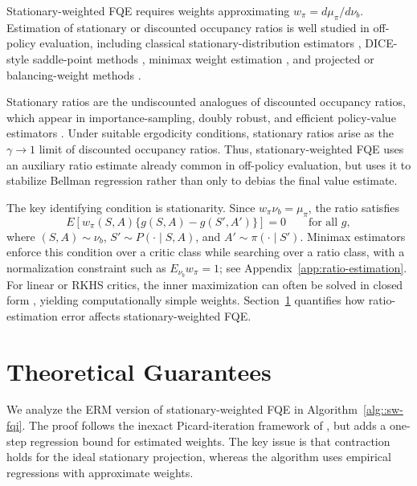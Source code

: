 \documentclass{article}
\theoremstyle{plain}
\theoremstyle{definition}
\theoremstyle{remark}
\begin{document}
Stationary-weighted FQE requires weights approximating
\(w_\pi=d\mu_\pi/d\nu_b\). Estimation of stationary or discounted occupancy
ratios is well studied in off-policy evaluation, including classical
stationary-distribution estimators
\citep{glynn1998estimation,paulin2015concentration,meggendorfer2023correct},
DICE-style saddle-point methods
\citep{liu2018breaking,nachum2019dualdice,nachum2019algaedice,
zhang2020gendice,lee2021optidice,lee2022coptidice}, minimax weight estimation
\citep{uehara2020minimax,uehara2021finite}, and projected or balancing-weight
methods \citep{wang2023projected,amortila2024harnessing}.

Stationary ratios are the undiscounted analogues of discounted occupancy ratios,
which appear in importance-sampling, doubly robust, and efficient policy-value
estimators
\citep{jiang2016doubly,thomas2016data,kallus2020double,kallus2022efficiently,
van2025automaticDRL}. Under suitable ergodicity conditions,
stationary ratios arise as the \(\gamma\to1\) limit of discounted occupancy
ratios. Thus, stationary-weighted FQE uses an auxiliary ratio estimate already
common in off-policy evaluation, but uses it to stabilize Bellman regression
rather than only to debias the final value estimate.

The key identifying condition is stationarity. Since \(w_\pi\nu_b=\mu_\pi\),
the ratio satisfies
\[
E\!\left[
w_\pi(S,A)\{g(S,A)-g(S',A')\}
\right]=0
\qquad \text{for all } g,
\]
where \((S,A)\sim\nu_b\), \(S'\sim P(\cdot\mid S,A)\), and
\(A'\sim\pi(\cdot\mid S')\). Minimax estimators enforce this condition over a
critic class while searching over a ratio class, with a normalization constraint
such as \(E_{\nu_b}w_\pi=1\); see Appendix~\ref{app:ratio-estimation}. For
linear or RKHS critics, the inner maximization can often be solved in closed
form
\citep{dikkala2020minimax,uehara2020minimax,wang2023projected,
olivas2025source}, yielding computationally simple weights. Section~\ref{sec:theorymain}
quantifies how ratio-estimation error affects stationary-weighted FQE.

 

\section{Theoretical Guarantees}
\label{sec:theorymain}

We analyze the ERM version of stationary-weighted FQE in
Algorithm~\ref{alg::sw-fqi}. The proof follows the inexact Picard-iteration
framework of \citet{munos2008finite}, but adds a one-step regression bound for
estimated weights. The key issue is that contraction holds for the ideal
stationary projection, whereas the algorithm uses empirical regressions with
approximate weights.
\end{document}
